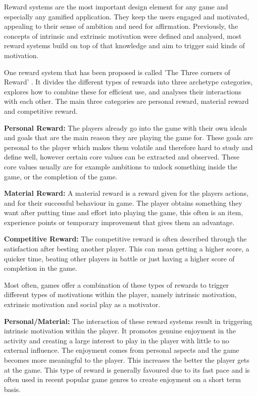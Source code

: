 Reward systems are the most important design element for any game and especially any gamified application. They keep the users engaged and motivated, appealing to their sense of ambition and need for affirmation. Previously, the concepts of intrinsic and extrinsic motivation were defined and analysed, most reward systems build on top of that knowledge and aim to trigger said kinds of motivation.

One reward system that has been proposed is called 'The Three corners of Reward' \cite{corners}. It divides the different types of rewards into three archetype categories, explores how to combine these for efficient use, and analyses their interactions with each other. The main three categories are personal reward, material reward and competitive reward.

\textbf{Personal Reward:}
The players already go into the game with their own ideals and goals that are the main reason they are playing the game for. These goals are personal to the player which makes them volatile and therefore hard to study and define well, however certain core values can be extracted and observed. These core values usually are for example ambitions to unlock something inside the game, or the completion of the game.

\textbf{Material Reward:}
A material reward is a reward given for the players actions, and for their successful behaviour in game. The player obtains something they want after putting time and effort into playing the game, this often is an item, experience points or temporary improvement that gives them an advantage.

\textbf{Competitive Reward:}
The competitive reward is often described through the satisfaction after besting another player. This can mean getting a higher score, a quicker time, beating other players in battle or just having a higher score of completion in the game.

Most often, games offer a combination of these types of rewards to trigger different types of motivations within the player, namely intrinsic motivation, extrinsic motivation and social play as a motivator.

\textbf{Personal/Material:} 
The interaction of these reward systems result in triggering intrinsic motivation within the player. It promotes genuine enjoyment in the activity and creating a large interest to play in the player with little to no external influence. The enjoyment comes from personal aspects and the game becomes more meaningful to the player. This increases the better the player gets at the game. This type of reward is generally favoured due to its fast pace and is often used in recent popular game genres to create enjoyment on a short term basis.

